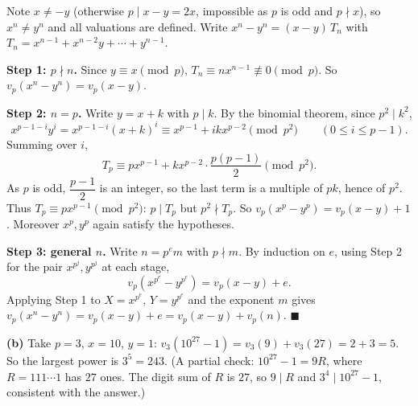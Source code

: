 Note $x\ne-y$ (otherwise $p\mid x-y=2x$, impossible as $p$ is odd and $p\nmid x$), so $x^n\ne y^n$ and all valuations are defined. Write $x^n-y^n=(x-y)\,T_n$ with $T_n=x^{n-1}+x^{n-2}y+\cdots+y^{n-1}$.

\textbf{Step 1: $p\nmid n$.} Since $y\equiv x\pmod p$, $T_n\equiv nx^{n-1}\not\equiv0\pmod p$. So $v_p\left(x^n-y^n\right)=v_p(x-y)$.

\textbf{Step 2: $n=p$.} Write $y=x+k$ with $p\mid k$. By the binomial theorem, since $p^2\mid k^2$,
\[x^{p-1-i}y^i=x^{p-1-i}(x+k)^i\equiv x^{p-1}+ikx^{p-2}\pmod{p^2}\qquad(0\le i\le p-1).\]
Summing over $i$,
\[T_p\equiv px^{p-1}+kx^{p-2}\cdot\dfrac{p(p-1)}{2}\pmod{p^2}.\]
As $p$ is odd, $\dfrac{p-1}{2}$ is an integer, so the last term is a multiple of $pk$, hence of $p^2$. Thus $T_p\equiv px^{p-1}\pmod{p^2}$: $p\mid T_p$ but $p^2\nmid T_p$. So $v_p\left(x^p-y^p\right)=v_p(x-y)+1$. Moreover $x^p,y^p$ again satisfy the hypotheses.

\textbf{Step 3: general $n$.} Write $n=p^em$ with $p\nmid m$. By induction on $e$, using Step 2 for the pair $x^{p^{j}},y^{p^{j}}$ at each stage,
\[v_p\left(x^{p^e}-y^{p^e}\right)=v_p(x-y)+e.\]
Applying Step 1 to $X=x^{p^e}$, $Y=y^{p^e}$ and the exponent $m$ gives $v_p\left(x^n-y^n\right)=v_p(x-y)+e=v_p(x-y)+v_p(n)$. $\blacksquare$

\textbf{(b)} Take $p=3$, $x=10$, $y=1$: $v_3\left(10^{27}-1\right)=v_3(9)+v_3(27)=2+3=5$. So the largest power is $\boxed{3^5=243}$. (A partial check: $10^{27}-1=9R$, where $R=111\cdots1$ has $27$ ones. The digit sum of $R$ is $27$, so $9\mid R$ and $3^4\mid10^{27}-1$, consistent with the answer.)
